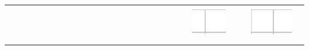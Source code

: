 \documentclass[10pt]{article}
\begin{document}
\begin{center}
\begin{tabular}{|c|c|c|c|c|c|c|c|c|c|c|c|c|c|c|c|c|c|c|c|c|c|c|c|c|c|c|}
 &  \\
\hline
 &  &  &  &  &  &  &  &  &  &  &  &  &  &  &  &  &  &  &  &  &  &  &  &  &  &  \\
\hline
 &  &  &  &  &  &  &  &  &  &  &  &  &  &  &  &  &  &  &  &  &  & \includegraphics[max width=\textwidth]{2024_11_21_7b5527312ea89ae66fd0g-24(1)}
 &  &  & \includegraphics[max width=\textwidth]{2024_11_21_7b5527312ea89ae66fd0g-24(3)}
 &  \\
\hline
 &  &  &  &  &  &  &  &  &  &  &  &  &  &  &  &  &  &  &  &  &  &  &  &  &  &  \\
\hline
 &  &  &  &  &  &  &  &  &  &  &  &  &  &  &  &  &  &  &  &  &  &  &  &  &  &  \\
\hline
\end{tabular}
\end{center}
\end{document}
